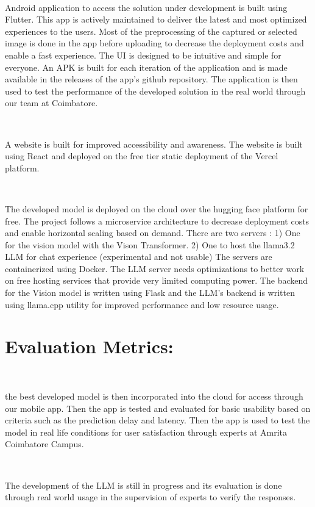 \

Android application to access the solution under development is built using Flutter. This app is actively maintained to deliver the latest and most optimized experiences to the users. Most of the preprocessing of the captured or selected image is done in the app before uploading to decrease the deployment costs and enable a fast experience. The UI is designed to be intuitive and simple for everyone. An APK is built for each iteration of the application and is made available in the releases of the app's github repository. The application is then used to test the performance of the developed solution in the real world through our team at Coimbatore.

\

A website is built for improved accessibility and awareness. The website is built using React and deployed on the free tier static deployment of the Vercel platform.

\

The developed model is deployed on the cloud over the hugging face platform for free. The project follows a microservice architecture to decrease deployment costs and enable horizontal scaling based on demand.
There are two servers : 1) One for the vision model with the Vison Transformer. 
2) One to host the llama3.2 LLM for chat experience (experimental and not usable)
The servers are containerized using Docker.
The LLM server needs optimizations to better work on free hosting services that provide very limited computing power. The backend for the Vision model is written using Flask and the LLM's backend is written using llama.cpp utility for improved performance and low resource usage.





\section{Evaluation Metrics:}

\

the best developed model is then incorporated into the cloud for access through our mobile app. Then the app is tested and evaluated for basic usability based on criteria such as the prediction delay and latency. Then the app is used to test the model in real life conditions for user satisfaction through experts at Amrita Coimbatore Campus.

\

The development of the LLM is still in progress and its evaluation is done through real world usage in the supervision of experts to verify the responses.

